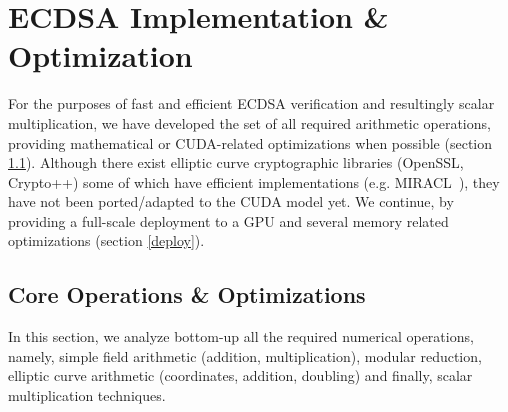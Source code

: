 \documentclass[11pt,twocolumn]{IEEEtran}
\begin{document}
\section{ECDSA Implementation \& Optimization}\label{implementation}
For the purposes of fast and efficient ECDSA verification and resultingly scalar multiplication, we have developed the set of all required arithmetic operations, providing mathematical or CUDA-related optimizations when possible (section \ref{core}). Although there exist elliptic curve cryptographic libraries (OpenSSL, Crypto++) some of which have efficient implementations (e.g. MIRACL~\cite{libs}), they have not been ported/adapted to the CUDA model yet. We continue, by providing a full-scale deployment to a GPU and several memory related optimizations (section \ref{deploy}).
\subsection{Core Operations \& Optimizations}\label{core}
In this section, we analyze bottom-up all the required numerical operations, namely, simple field arithmetic (addition, multiplication), modular reduction, elliptic curve arithmetic (coordinates, addition, doubling) and finally, scalar multiplication techniques.
\end{document}
